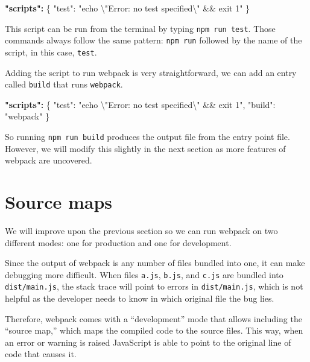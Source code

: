 \documentclass[10pt,]{krantz}
\makeatletter
\newenvironment{Shaded}{\begin{snugshade}}{\end{snugshade}}
\newcommand{\CharTok}[1]{\textcolor[rgb]{0.5,0.5,0.5}{#1}}
\newcommand{\DataTypeTok}[1]{\textcolor[rgb]{0.27,0.27,0.27}{#1}}
\newcommand{\ErrorTok}[1]{\textcolor[rgb]{0.14,0.14,0.14}{\textbf{#1}}}
\newcommand{\FunctionTok}[1]{\textcolor[rgb]{0,0,0}{#1}}
\newcommand{\StringTok}[1]{\textcolor[rgb]{0.5,0.5,0.5}{#1}}
\newenvironment{kframe}{%
\medskip{}
\setlength{\fboxsep}{.8em}
 \def\at@end@of@kframe{}%
 \ifinner\ifhmode%
  \def\at@end@of@kframe{\end{minipage}}%
  \begin{minipage}{\columnwidth}%
 \fi\fi%
 \def\FrameCommand##1{\hskip\@totalleftmargin \hskip-\fboxsep
 \colorbox{shadecolor}{##1}\hskip-\fboxsep
     \hskip-\linewidth \hskip-\@totalleftmargin \hskip\columnwidth}%
 \MakeFramed {\advance\hsize-\width
   \@totalleftmargin\z@ \linewidth\hsize
   \@setminipage}}%
 {\par\unskip\endMakeFramed%
 \at@end@of@kframe}
\renewenvironment{Shaded}{\begin{kframe}}{\end{kframe}}
\makeatother
\begin{document}
\begin{Shaded}
\begin{Highlighting}[]
\ErrorTok{"scripts":} \FunctionTok{\{}
  \DataTypeTok{"test"}\FunctionTok{:} \StringTok{"echo }\CharTok{\textbackslash{}"}\StringTok{Error: no test specified}\CharTok{\textbackslash{}"}\StringTok{ && exit 1"}
\FunctionTok{\}}
\end{Highlighting}
\end{Shaded}

This script can be run from the terminal by typing \texttt{npm\ run\ test}. Those commands always follow the same pattern: \texttt{npm\ run} followed by the name of the script, in this case, \texttt{test}.

Adding the script to run webpack is very straightforward, we can add an entry called \texttt{build} that runs \texttt{webpack}.

\begin{Shaded}
\begin{Highlighting}[]
\ErrorTok{"scripts":} \FunctionTok{\{}
  \DataTypeTok{"test"}\FunctionTok{:} \StringTok{"echo }\CharTok{\textbackslash{}"}\StringTok{Error: no test specified}\CharTok{\textbackslash{}"}\StringTok{ && exit 1"}\FunctionTok{,}
  \DataTypeTok{"build"}\FunctionTok{:} \StringTok{"webpack"}
\FunctionTok{\}}
\end{Highlighting}
\end{Shaded}

So running \texttt{npm\ run\ build} produces the output file from the entry point file. However, we will modify this slightly in the next section as more features of webpack are uncovered.

\hypertarget{webpack-intro-webpack-mode}{%
\section{Source maps}\label{webpack-intro-webpack-mode}}

We will improve upon the previous section so we can run webpack on two different modes: one for production and one for development.

Since the output of webpack is any number of files bundled into one, it can make debugging more difficult. When files \texttt{a.js}, \texttt{b.js}, and \texttt{c.js} are bundled into \texttt{dist/main.js}, the stack trace will point to errors in \texttt{dist/main.js}, which is not helpful as the developer needs to know in which original file the bug lies.

Therefore, webpack comes with a ``development'' mode that allows including the ``source map,'' which maps the compiled code to the source files. This way, when an error or warning is raised JavaScript is able to point to the original line of code that causes it.
\end{document}
